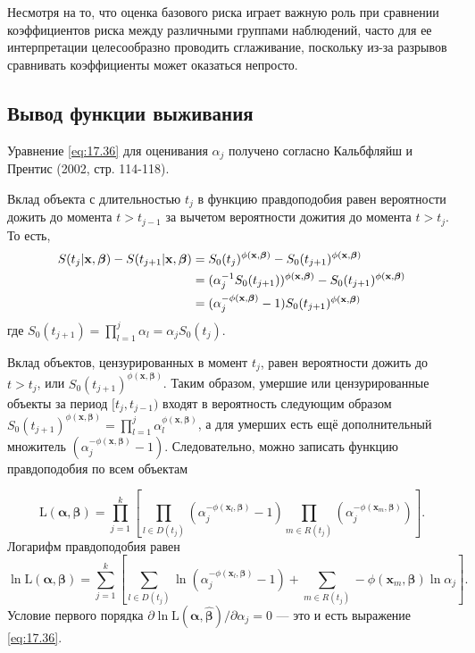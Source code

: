 Несмотря на то, что оценка базового риска играет важную роль при сравнении коэффициентов риска между различными группами наблюдений, часто для ее интерпретации целесообразно проводить сглаживание, поскольку из-за разрывов сравнивать коэффициенты может оказаться непросто.


\subsection{Вывод функции выживания}\label{sec:17.8.4}

\noindent
Уравнение \ref{eq:17.36} для оценивания $\alpha_j$ получено согласно Кальбфляйш и Прентис (2002, стр. 114-118).

Вклад объекта с длительностью $t_j$ в функцию правдоподобия равен вероятности дожить до момента $t>t_{j-1}$ за вычетом вероятности дожития до момента $t>t_j$. То есть,
        \begin{align}
        S(t_j|\mathbf{x},\bm{\beta})-S(t_{j+1}|\mathbf{x},\bm{\beta})&=S_0(t_j)^{\phi(\mathbf{x},\bm{\beta})}-S_0(t_{j+1})^{\phi(\mathbf{x},\bm{\beta})}\notag\\
        &=(\alpha^{-1}_jS_0(t_{j+1}))^{\phi(\mathbf{x},\bm{\beta})}-S_0(t_{j+1})^{\phi(\mathbf{x},\bm{\beta})}\notag\\
        &=(\alpha^{-\phi(\mathbf{x},\bm{\beta})}_j-1)S_0(t_{j+1})^{\phi(\mathbf{x},\bm{\beta})}\notag
        \end{align}
где $S_0(t_{j+1})=\prod^{j}_{l=1}\alpha_l=\alpha_jS_0(t_j)$. 

Вклад объектов, цензурированных в момент $t_j$, равен вероятности дожить до $t > t_j$, или $S_0(t_{j+1})^{\phi(\mathbf{x},\bm{\beta})}$. Таким образом, умершие или цензурированные объекты за период $[t_j,t_{j-1})$ входят в вероятность следующим образом $S_0(t_{j+1})^{\phi(\mathbf{x},\bm{\beta})}=\prod^{j}_{l=1}\alpha^{\phi(\mathbf{x},\bm{\beta})}_l$, а для умерших есть ещё дополнительный множитель $\left(\alpha^{-\phi(\mathbf{x},\bm{\beta})}_j-1\right)$. Следовательно, можно записать функцию правдоподобия по всем объектам

        $$\mathrm{L}(\bm{\alpha},\bm{\beta})=\prod^{k}_{j=1}\left[\prod_{l\in D(t_j)}(\alpha^{-\phi(\mathbf{x}_l,\bm{\beta})}_j-1)\prod_{m\in R(t_j)}(\alpha^{-\phi(\mathbf{x}_m,\bm{\beta})}_j)\right].$$
Логарифм правдоподобия равен
        $$\ln\mathrm{L}(\bm{\alpha},\bm{\beta})=\sum^{k}_{j=1}\left[\sum_{l\in D(t_j)}\ln(\alpha^{-\phi(\mathbf{x}_l,\bm{\beta})}_j-1)+\sum_{m\in R(t_j)}-\phi(\mathbf{x}_m,\bm{\beta})\ln\alpha_j \right].$$
Условие первого порядка $\partial\ln\mathrm{L}(\bm{\alpha},\bm{\hat{\beta}})/\partial\alpha_j=0$ --- это и есть выражение \ref{eq:17.36}.




